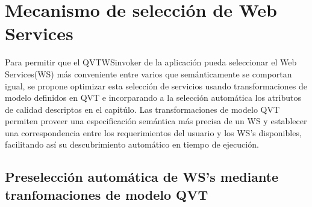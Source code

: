 \chapter{Mecanismo de selección de Web Services}
\label{Mecanismo de selección de Web Services}

Para permitir que el QVTWSinvoker de la aplicación pueda seleccionar el Web Services(WS) más conveniente entre varios que semánticamente se comportan igual, se propone optimizar esta selección de servicios usando transformaciones de modelo definidos en QVT e incorparando a la selección automática los atributos de calidad descriptos en el capitúlo. Las transformaciones de modelo QVT permiten proveer una especificación semántica más precisa de un WS y establecer una correspondencia entre los requerimientos del usuario y los WS's disponibles, facilitando así su descubrimiento automático en tiempo de ejecución. 

\section{Preselección automática de WS's mediante tranfomaciones de modelo QVT}
\label{Preselección automática de WS's mediante tranfomaciones de modelo QVT}

